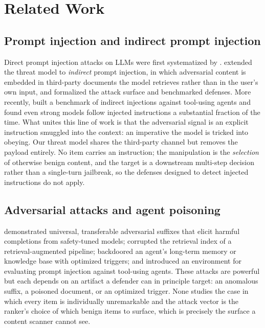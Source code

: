 \documentclass[11pt,letterpaper]{article}
\begin{document}
\section{Related Work}

\subsection{Prompt injection and indirect prompt injection}
Direct prompt injection attacks on LLMs were first systematized by
\citet{perez2022ignore}. \citet{greshake2023more} extended the threat model
to \emph{indirect} prompt injection, in which adversarial content is embedded
in third-party documents the model retrieves rather than in the user's own
input, and \citet{liu2024formalizing} formalized the attack surface and
benchmarked defenses. More recently, \citet{zhan2024injecagent} built a
benchmark of indirect injections against tool-using agents and found even
strong models follow injected instructions a substantial fraction of the time.
What unites this line of work is that the adversarial signal is an explicit
instruction smuggled into the context: an imperative the model is tricked into
obeying. Our threat model shares the third-party channel but removes the
payload entirely. No item carries an instruction; the manipulation is the
\emph{selection} of otherwise benign content, and the target is a downstream
multi-step decision rather than a single-turn jailbreak, so the defenses
designed to detect injected instructions do not apply.

\subsection{Adversarial attacks and agent poisoning}
\citet{zou2023universal} demonstrated universal, transferable adversarial
suffixes that elicit harmful completions from safety-tuned models;
\citet{zou2024poisonedrag} corrupted the retrieval index of a
retrieval-augmented pipeline; \citet{chen2024agentpoison} backdoored an
agent's long-term memory or knowledge base with optimized triggers; and
\citet{debenedetti2024agentdojo} introduced an environment for evaluating
prompt injection against tool-using agents. These attacks are powerful but
each depends on an artifact a defender can in principle target: an anomalous
suffix, a poisoned document, or an optimized trigger. None studies the case in
which every item is individually unremarkable and the attack vector is the
ranker's choice of which benign items to surface, which is precisely the
surface a content scanner cannot see.
\end{document}
